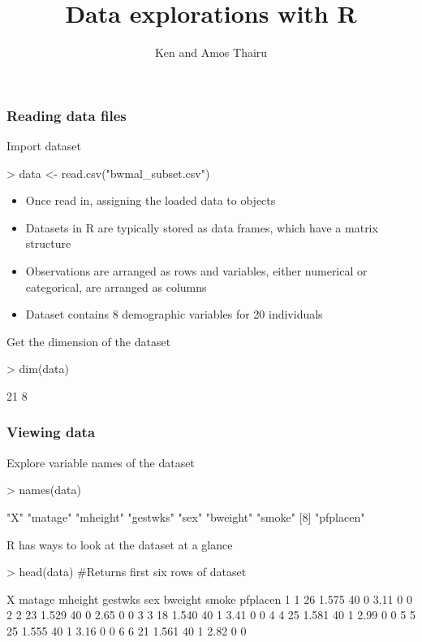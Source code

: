 \documentclass{beamer}
\title{Data explorations with R}
\author{Ken and Amos Thairu}
\begin{document}

\begin{frame}
\titlepage
\end{frame}

\begin{frame}[fragile]\frametitle{Reading data files}
Import dataset
\begin{Schunk}
\begin{Sinput}
> data <- read.csv("bwmal_subset.csv")
\end{Sinput}
\end{Schunk}
\pause
\begin{itemize}
  \item Once read in, assigning the loaded data to objects
  \item Datasets in R are typically stored as data frames, which have a matrix structure 
  \item Observations are arranged as rows and variables, either numerical or categorical, are arranged as columns
  \item Dataset contains 8 demographic variables for 20 individuals
\end{itemize}
\pause
Get the dimension of the dataset
\begin{Schunk}
\begin{Sinput}
> dim(data)
\end{Sinput}
\begin{Soutput}
[1] 21  8
\end{Soutput}
\end{Schunk}
\end{frame}

\begin{frame}[fragile]\frametitle{Viewing data}
\small
Explore variable names of the dataset
\begin{Schunk}
\begin{Sinput}
> names(data) 
\end{Sinput}
\begin{Soutput}
[1] "X"        "matage"   "mheight"  "gestwks"  "sex"      "bweight"  "smoke"   
[8] "pfplacen"
\end{Soutput}
\end{Schunk}
R has ways to look at the dataset at a glance
\begin{Schunk}
\begin{Sinput}
> head(data) #Returns first six rows of dataset
\end{Sinput}
\begin{Soutput}
  X matage mheight gestwks sex bweight smoke pfplacen
1 1     26   1.575      40   0    3.11     0        0
2 2     23   1.529      40   0    2.65     0        0
3 3     18   1.540      40   1    3.41     0        0
4 4     25   1.581      40   1    2.99     0        0
5 5     25   1.555      40   1    3.16     0        0
6 6     21   1.561      40   1    2.82     0        0
\end{Soutput}
\end{Schunk}
\end{frame}
\end{document}
